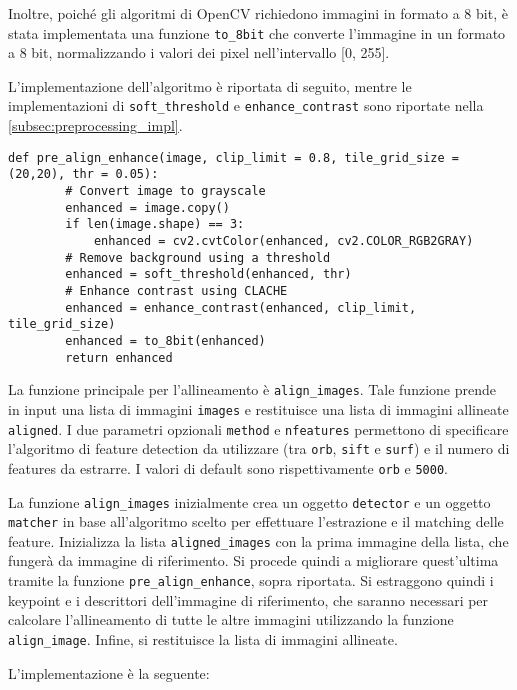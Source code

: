 Inoltre, poiché gli algoritmi di OpenCV richiedono immagini in formato a 8 bit, è stata implementata una funzione \texttt{to\_8bit} che converte l'immagine in un formato a 8 bit, normalizzando i valori dei pixel nell'intervallo [0, 255].

L'implementazione dell'algoritmo è riportata di seguito, mentre le implementazioni di \texttt{soft\_threshold} e \texttt{enhance\_contrast}  sono riportate nella \cref{subsec:preprocessing_impl}.

\begin{lstlisting}[label={lst:pre_align_enhance}]
    def pre_align_enhance(image, clip_limit = 0.8, tile_grid_size = (20,20), thr = 0.05):
        # Convert image to grayscale
        enhanced = image.copy()
        if len(image.shape) == 3:
            enhanced = cv2.cvtColor(enhanced, cv2.COLOR_RGB2GRAY)
        # Remove background using a threshold
        enhanced = soft_threshold(enhanced, thr)
        # Enhance contrast using CLACHE
        enhanced = enhance_contrast(enhanced, clip_limit, tile_grid_size)
        enhanced = to_8bit(enhanced)
        return enhanced
\end{lstlisting}

La funzione principale per l'allineamento è \texttt{align\_images}. Tale funzione prende in input una lista di immagini \texttt{images} e restituisce una lista di immagini allineate \texttt{aligned}. I due parametri opzionali \texttt{method} e \texttt{nfeatures} permettono di specificare l'algoritmo di feature detection da utilizzare (tra \texttt{orb}, \texttt{sift} e \texttt{surf}) e il numero di features da estrarre. I valori di default sono rispettivamente \texttt{orb} e \texttt{5000}.

La funzione \texttt{align\_images} inizialmente crea un oggetto \texttt{detector} e un oggetto \texttt{matcher} in base all'algoritmo scelto per effettuare l'estrazione e il matching delle feature. Inizializza la lista \texttt{aligned\_images} con la prima immagine della lista, che fungerà da immagine di riferimento. Si procede quindi a migliorare quest'ultima tramite la funzione \texttt{pre\_align\_enhance}, sopra riportata. Si estraggono quindi i keypoint e i descrittori dell'immagine di riferimento, che saranno necessari per calcolare l'allineamento di tutte le altre immagini utilizzando la funzione \texttt{align\_image}. Infine, si restituisce la lista di immagini allineate.

L'implementazione è la seguente:

